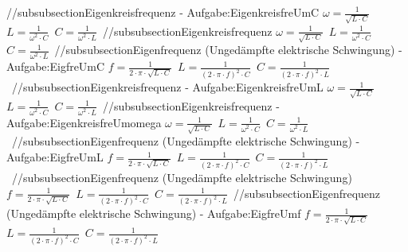 //subsubsection{Eigenkreisfrequenz - Aufgabe:EigenkreisfreUmC} 
$ \omega  = \frac{ 1}{\sqrt{L\cdot C}} $\ 
$ L= \frac{ 1}{\omega ^{2} \cdot C} $\ 
$ C = \frac{ 1}{\omega ^{2} \cdot L} $\ 
//subsubsection{Eigenkreisfrequenz} 
$ \omega  = \frac{ 1}{\sqrt{L\cdot C}} $\ 
$ L= \frac{ 1}{\omega ^{2} \cdot C} $\ 
$ C = \frac{ 1}{\omega ^{2} \cdot L} $\ 
//subsubsection{Eigenfrequenz (Ungedämpfte elektrische Schwingung) - Aufgabe:EigfreUmC} 
$ f = \frac{ 1}{2\cdot \pi \cdot \sqrt{L\cdot C}} $\ 
$ L = \frac{ 1}{(2\cdot \pi \cdot f)^{2} \cdot C} $\ 
$ C = \frac{ 1}{(2\cdot \pi \cdot f)^{2} \cdot L} $\ 
//subsubsection{Eigenkreisfrequenz - Aufgabe:EigenkreisfreUmL} 
$ \omega  = \frac{ 1}{\sqrt{L\cdot C}} $\ 
$ L= \frac{ 1}{\omega ^{2} \cdot C} $\ 
$ C = \frac{ 1}{\omega ^{2} \cdot L} $\ 
//subsubsection{Eigenkreisfrequenz - Aufgabe:EigenkreisfreUmomega} 
$ \omega  = \frac{ 1}{\sqrt{L\cdot C}} $\ 
$ L= \frac{ 1}{\omega ^{2} \cdot C} $\ 
$ C = \frac{ 1}{\omega ^{2} \cdot L} $\ 
//subsubsection{Eigenfrequenz (Ungedämpfte elektrische Schwingung) - Aufgabe:EigfreUmL} 
$ f = \frac{ 1}{2\cdot \pi \cdot \sqrt{L\cdot C}} $\ 
$ L = \frac{ 1}{(2\cdot \pi \cdot f)^{2} \cdot C} $\ 
$ C = \frac{ 1}{(2\cdot \pi \cdot f)^{2} \cdot L} $\ 
//subsubsection{Eigenfrequenz (Ungedämpfte elektrische Schwingung)} 
$ f = \frac{ 1}{2\cdot \pi \cdot \sqrt{L\cdot C}} $\ 
$ L = \frac{ 1}{(2\cdot \pi \cdot f)^{2} \cdot C} $\ 
$ C = \frac{ 1}{(2\cdot \pi \cdot f)^{2} \cdot L} $\ 
//subsubsection{Eigenfrequenz (Ungedämpfte elektrische Schwingung) - Aufgabe:EigfreUmf} 
$ f = \frac{ 1}{2\cdot \pi \cdot \sqrt{L\cdot C}} $\ 
$ L = \frac{ 1}{(2\cdot \pi \cdot f)^{2} \cdot C} $\ 
$ C = \frac{ 1}{(2\cdot \pi \cdot f)^{2} \cdot L} $\ 
